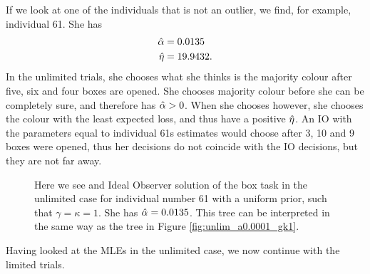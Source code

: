 If we look at one of the individuals that is not an outlier, we find, for example, individual 61. She has
\begin{equation}
\label{mles_unilim_person61}
    \begin{aligned}
        \hat{\alpha} &= 0.0135\\
        \hat{\eta} &= 19.9432.
    \end{aligned}
\end{equation}
In the unlimited trials, she chooses what she thinks is the majority colour after five, six and four boxes are opened. She chooses majority colour before she can be completely sure, and therefore has $\hat{\alpha}>0$. When she chooses however, she chooses the colour with the least expected loss, and thus have a positive $\hat{\eta}$. An IO with the parameters equal to individual 61s estimates would choose after 3, 10 and 9 boxes were opened, thus her decisions do not coincide with the IO decisions, but they are not far away.  
\begin{figure}
    \centering
    \scalebox{0.7}{}
    \caption[IO solution of individual number 61 with $\ha=0.0135$ and $\gamma=\kappa=1$]{Here we see and Ideal Observer solution of the box task in the unlimited case for individual number 61 with a uniform prior, such that $\gamma=\kappa=1$. She has $\ha=0.0135$. This tree can be interpreted in the same way as the tree in Figure \ref{fig:unlim_a0.0001_gk1}.}
    \label{fig:IO_sol_individual61}
\end{figure}

Having looked at the MLEs in the unlimited case, we now continue with the limited trials. 


